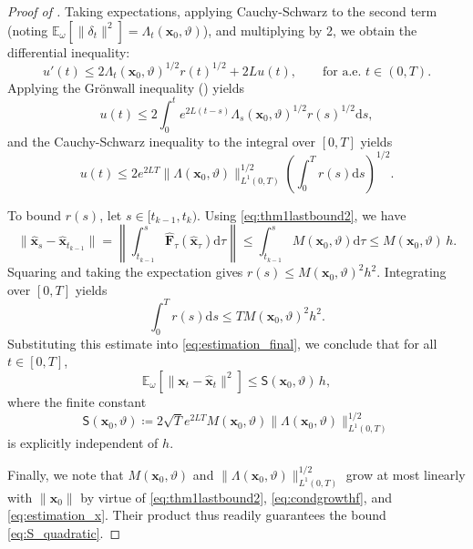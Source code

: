 \documentclass[twoside,11pt]{article}
\theoremstyle{plain}
\def\E{\mathbb E}
\newcommand{\diff}{\mathrm{d}}
\newcommand{\bfF}{\mathbf{F}}
\newcommand{\bfx}{\mathbf{x}}
\begin{document}
\begin{proof}[Proof of ]
Taking expectations, applying Cauchy-Schwarz to the second term (noting $\E_\omega[\|\delta_t\|^2] = \Lambda_t(\bfx_0,\vartheta)$), and multiplying by 2, we obtain the differential inequality:
\begin{equation}\label{eq:ddtexxrb}
u'(t) \le 2\Lambda_t(\bfx_0,\vartheta)^{1/2}r(t)^{1/2} + 2Lu(t), \qquad \text{for a.e. } t\in(0,T).
\end{equation}
Applying the Grönwall inequality () yields
\begin{equation*}
u(t) \le 2\int_0^t e^{2L(t-s)}\Lambda_s(\bfx_0,\vartheta)^{1/2}r(s)^{1/2}\diff s,
\end{equation*}
and the Cauchy-Schwarz inequality to the integral over $[0,T]$ yields
\begin{equation}\label{eq:estimation_final}
u(t) \le 2e^{2LT}\|\Lambda(\bfx_0,\vartheta)\|_{L^1(0,T)}^{1/2}\left(\int_0^T r(s)\diff s\right)^{1/2}.
\end{equation}

To bound $r(s)$, let $s\in[t_{k-1},t_k)$. Using \eqref{eq:thm1lastbound2}, we have
\begin{equation*}
\|\hat{\bfx}_s-\hat{\bfx}_{t_{k-1}}\| = \left\|\int_{t_{k-1}}^s \hat{\bfF}_\tau(\hat{\bfx}_\tau)\diff\tau\right\| \le \int_{t_{k-1}}^s M(\bfx_0,\vartheta)\diff\tau \le M(\bfx_0,\vartheta)\, h.
\end{equation*}
Squaring and taking the expectation gives $r(s) \le M(\bfx_0,\vartheta)^2 h^2$. Integrating over $[0,T]$ yields
\begin{equation*}
\int_0^T r(s)\diff s \le T M(\bfx_0,\vartheta)^2 h^2.
\end{equation*}
Substituting this estimate into \eqref{eq:estimation_final}, we conclude that for all $t\in[0,T]$,
\begin{equation*}
\E_\omega\left[\|\bfx_t-\hat{\bfx}_t\|^2\right] \le \mathsf{S}(\bfx_0,\vartheta) \, h,
\end{equation*}
where the finite constant
\begin{equation}\label{eq:Cx0theta}
\mathsf{S}(\bfx_0,\vartheta) \coloneqq 2\sqrt{T}e^{2LT} M(\bfx_0,\vartheta) \|\Lambda(\bfx_0,\vartheta)\|_{L^1(0,T)}^{1/2}
\end{equation}
is explicitly independent of $h$. 

Finally, we note that $M(\bfx_0, \vartheta)$ and $\|\Lambda(\bfx_0, \vartheta)\|_{L^1(0,T)}^{1/2}$ grow at most linearly with $\|\bfx_0\|$ by virtue of \eqref{eq:thm1lastbound2}, \eqref{eq:condgrowthf}, and \eqref{eq:estimation_x}. Their product thus readily guarantees the bound \eqref{eq:S_quadratic}.
\end{proof}
\end{document}
